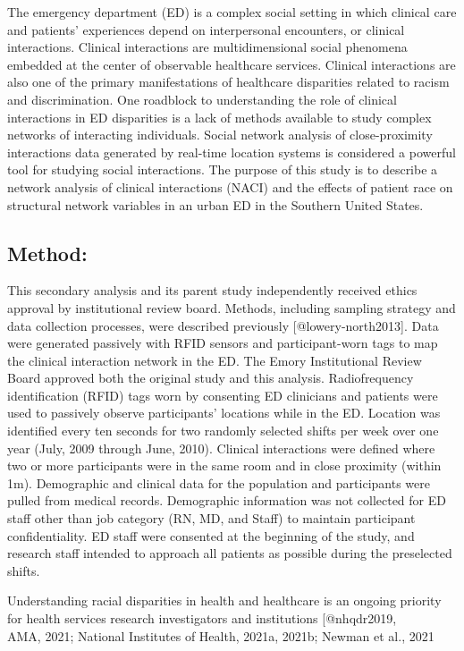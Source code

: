 \documentclass[
]{article}
\begin{document}
The emergency department (ED) is a complex social setting in which
clinical care and patients' experiences depend on interpersonal
encounters, or clinical interactions. Clinical interactions are
multidimensional social phenomena embedded at the center of observable
healthcare services. Clinical interactions are also one of the primary
manifestations of healthcare disparities related to racism and
discrimination. One roadblock to understanding the role of clinical
interactions in ED disparities is a lack of methods available to study
complex networks of interacting individuals. Social network analysis of
close-proximity interactions data generated by real-time location
systems is considered a powerful tool for studying social interactions.
The purpose of this study is to describe a network analysis of clinical
interactions (NACI) and the effects of patient race on structural
network variables in an urban ED in the Southern United States.

\hypertarget{method}{%
\subsection{Method:}\label{method}}

This secondary analysis and its parent study independently received
ethics approval by institutional review board. Methods, including
sampling strategy and data collection processes, were described
previously {[}@lowery-north2013{]}. Data were generated passively with
RFID sensors and participant-worn tags to map the clinical interaction
network in the ED. The Emory Institutional Review Board approved both
the original study and this analysis. Radiofrequency identification
(RFID) tags worn by consenting ED clinicians and patients were used to
passively observe participants' locations while in the ED. Location was
identified every ten seconds for two randomly selected shifts per week
over one year (July, 2009 through June, 2010). Clinical interactions
were defined where two or more participants were in the same room and in
close proximity (within 1m). Demographic and clinical data for the
population and participants were pulled from medical records.
Demographic information was not collected for ED staff other than job
category (RN, MD, and Staff) to maintain participant confidentiality. ED
staff were consented at the beginning of the study, and research staff
intended to approach all patients as possible during the preselected
shifts.

Understanding racial disparities in health and healthcare is an ongoing
priority for health services research investigators and institutions
{[}@nhqdr2019,\\
AMA, 2021; National Institutes of Health, 2021a, 2021b; Newman et al.,
2021
\end{document}
